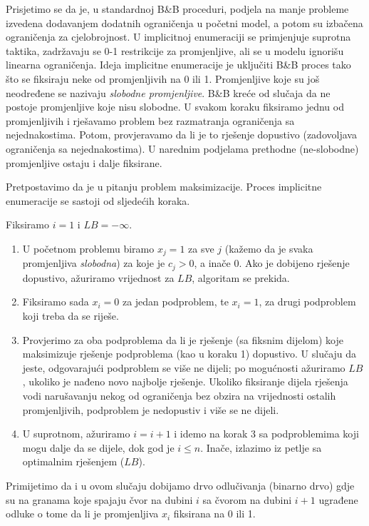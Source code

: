 \documentclass[b5paper, utf8, 11pt, colorlinks]{book}
\theoremstyle{definition}
\begin{document}
Prisjetimo se da je, u standardnoj B\&B proceduri, podjela na manje probleme izvedena dodavanjem dodatnih ograničenja u početni model, a potom su izbačena ograničenja za cjelobrojnost. 
U implicitnoj enumeraciji se primjenjuje suprotna taktika, zadržavaju se 0-1 restrikcije za promjenljive, ali se  u modelu ignorišu linearna ograničenja. 
Ideja implicitne enumeracije je uključiti B\&B proces tako što se fiksiraju neke od promjenljivih na 0 ili 1. Promjenljive koje su još neodređene se nazivaju \emph{slobodne promjenljive}.  B\&B kreće od slučaja da ne postoje promjenljive koje nisu slobodne. U svakom koraku fiksiramo jednu od promjenljivih i rješavamo problem bez razmatranja ograničenja sa nejednakostima. Potom, provjeravamo da li je to rješenje dopustivo (zadovoljava ograničenja sa nejednakostima). U narednim podjelama  prethodne (ne-slobodne) promjenljive ostaju i dalje fiksirane. 


Pretpostavimo da je u pitanju problem maksimizacije. Proces implicitne enumeracije se sastoji od sljedećih koraka. 

Fiksiramo $i=1$ i $LB=-\infty$. 

\begin{enumerate}
    \item U početnom problemu  biramo $x_j=1$ za sve $j$ (kažemo da je svaka promjenljiva \emph{slobodna}) za koje je $c_j > 0$, a inače 0. Ako je dobijeno rješenje dopustivo, ažuriramo vrijednost za $LB$, algoritam se prekida.
    \item Fiksiramo sada $x_i=0$ za jedan podproblem, te $x_i=1$, za drugi podproblem koji treba da se riješe.
    
    \item  Provjerimo za oba podproblema da li je rješenje (sa fiksnim dijelom) koje maksimizuje rješenje podproblema (kao u koraku 1) dopustivo. U slučaju da jeste,   odgovarajući podproblem se više ne dijeli; po mogućnosti ažuriramo $LB$, ukoliko je nađeno novo najbolje rješenje.  Ukoliko fiksiranje dijela rješenja vodi narušavanju nekog od ograničenja bez obzira na vrijednosti ostalih promjenljivih, podproblem je nedopustiv i više se ne dijeli. 
    
    
    \item U suprotnom, ažuriramo $i = i+1$ i idemo na korak 3 sa podproblemima koji mogu dalje da se dijele, dok god je $i \leq n$. Inače, izlazimo iz petlje sa optimalnim rješenjem ($LB$). 
\end{enumerate}
 Primijetimo da i u ovom slučaju dobijamo drvo odlučivanja (binarno drvo) gdje su na granama koje spajaju čvor na dubini $i$ sa čvorom na dubini $i+1$  ugrađene odluke o tome da li je promjenljiva $x_i$ fiksirana na 0 ili 1.
\end{document}
